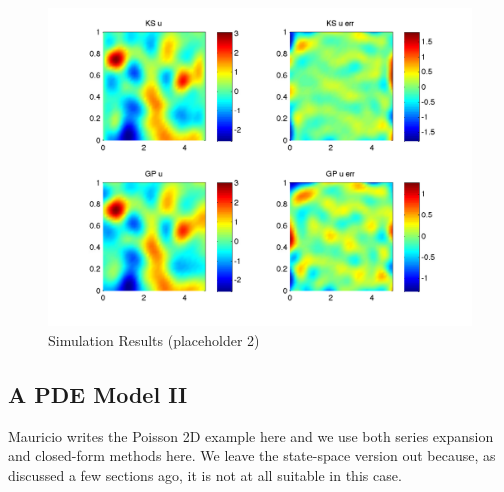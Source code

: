 \documentclass[journal]{IEEEtran}
\newcommand{\simo}[1]{{\color{red}#1}}
\begin{document}
\begin{figure}[!t]
\centering
\includegraphics[width=\columnwidth]{placeholder2}
\caption{Simulation Results (placeholder 2)}
\label{fig_sim}
\end{figure}

\subsection{A PDE Model II}

\simo{Mauricio writes the Poisson 2D example here and we use both series expansion and closed-form methods here. We leave the state-space version out because, as discussed a few sections ago, it is not at all suitable in this case.}

%
\end{document}
